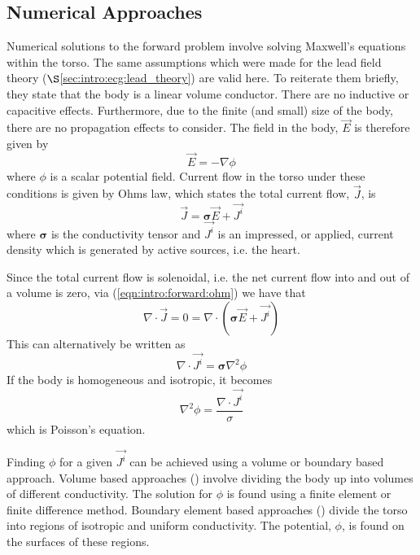 \subsection{Numerical Approaches}

Numerical solutions to the forward problem involve solving Maxwell's equations
within the torso.
The same assumptions which were made for the lead field theory
($\S$\ref{sec:intro:ecg:lead_theory}) are valid here.
To reiterate them briefly, they state that the body is a linear volume
conductor.
There are no inductive or capacitive effects.
Furthermore, due to the finite (and small) size of the body, there are no
propagation effects to consider.
The field in the body, $\vec{E}$ is therefore given by
\begin{equation}
\label{eqn:intro:forward:maxwell}
\vec{E} = -\nabla\phi
\end{equation}
where $\phi$ is a scalar potential field.
Current flow in the torso under these conditions is given by Ohms law, which
states the total current flow, $\vec{J}$, is
\begin{equation}
\label{eqn:intro:forward:ohm}
\vec{J} = \mathbf{\sigma}\vec{E} + \vec{J^i}
\end{equation}
where $\mathbf{\sigma}$ is the conductivity tensor and $\vec{J^i}$ is an
impressed, or applied, current density which is generated by active sources,
i.e. the heart.

Since the total current flow is solenoidal, i.e. the net current flow into and
out of a volume is zero, via (\ref{eqn:intro:forward:ohm}) we have that
\begin{equation}
\label{eqn:intro:forward:ohm2}
\nabla\cdot\vec{J} = 0 = \nabla\cdot\left(\mathbf{\sigma}\vec{E} + \vec{J^i} \right)
\end{equation}
This can alternatively be written as
\begin{equation}
\label{eqn:intro:forward:poisson}
\nabla\cdot\vec{J^i} = \mathbf{\sigma}\nabla^2\phi
\end{equation}
If the body is homogeneous and isotropic, it becomes
\begin{equation}
\label{eqn:intro:forward:poisson2}
\nabla^2\phi = \frac{\nabla\cdot\vec{J^i}}{\sigma}
\end{equation}
which is Poisson's equation.

Finding $\phi$ for a given $\vec{J^i}$ can be achieved using a volume or
boundary based approach.
Volume based approaches (\cite{Seger2004,Klepfer1997,Keller2007}) involve dividing the body
up into volumes of different conductivity.
The solution for $\phi$ is found using a finite element or finite difference
method.
Boundary element based approaches
(\cite{Barr1966,Clayton2002,Gulranjani1989,Weixue1996}) divide the torso into
regions of isotropic and uniform conductivity.
The potential, $\phi$, is found on the surfaces of these regions.

